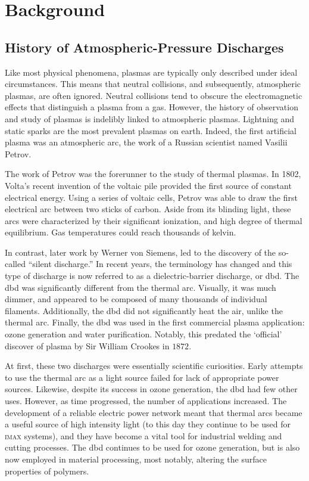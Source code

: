 \section{Background}

\subsection{History of Atmospheric-Pressure Discharges}

Like most physical phenomena, plasmas are typically only described under ideal
circumstances. This means that neutral collisions, and subsequently, atmospheric
plasmas, are often ignored. Neutral collisions tend to obscure the
electromagnetic effects that distinguish a plasma from a gas. However, the
history of observation and study of plasmas is indelibly linked to atmospheric
plasmas. Lightning and static sparks are the most prevalent plasmas on earth.
Indeed, the first artificial plasma was an atmospheric arc, the work of a
Russian scientist named Vasilii Petrov.

The work of Petrov was the forerunner to the study of thermal plasmas. In 1802,
Volta's recent invention of the voltaic pile provided the first source of
constant electrical energy. Using a series of voltaic cells, Petrov was able to
draw the first electrical arc between two sticks of carbon. Aside from its
blinding light, these arcs were characterized by their significant ionization,
and high degree of thermal equilibrium. Gas temperatures could reach thousands
of kelvin.

In contrast, later work by Werner von Siemens, led to the discovery of the
so-called ``silent discharge.'' In recent years, the terminology has changed and
this type of discharge is now referred to as a dielectric-barrier discharge, or
\acs{dbd}. The \acs{dbd} was significantly different from the thermal arc.
Visually, it was much dimmer, and appeared to be composed of many thousands of
individual filaments. Additionally, the \acs{dbd} did not significantly heat the
air, unlike the thermal arc. Finally, the \acs{dbd} was used in the first
commercial plasma application: ozone generation and water purification. Notably,
this predated the `official' discover of plasma by Sir William Crookes in
$1872$.

At first, these two discharges were essentially scientific curiosities. Early
attempts to use the thermal arc as a light source failed for lack of appropriate
power sources. Likewise, despite its success in ozone generation, the \acs{dbd}
had few other uses. However, as time progressed, the number of applications
increased. The development of a reliable electric power network meant that
thermal arcs became a useful source of high intensity light (to this day they
continue to be used for \textsc{imax} systems), and they have become a vital
tool for industrial welding and cutting processes. The \acs{dbd} continues to be
used for ozone generation, but is also now employed in material processing, most
notably, altering the surface properties of polymers.


